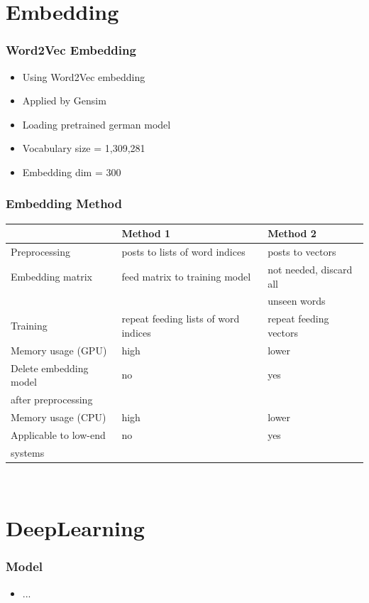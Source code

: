 \documentclass[compress,aspectratio=169]{beamer} %
\begin{document}
\section{Embedding}

\begin{frame}[fragile]
	\frametitle{Word2Vec Embedding}
	\begin{itemize}
		\item Using Word2Vec embedding~\cite{word2vec}
		\item Applied by Gensim~\cite{gensim}
		\item Loading pretrained german model~\cite{depset.ai}
		\item Vocabulary size = 1,309,281
		\item Embedding dim = 300
	\end{itemize}
\end{frame}

\begin{frame}[fragile]
	\frametitle{Embedding Method}
	\centering\small
	\begin{tabular}{l l l}
		& Method 1 & Method 2 \\
		\hline
		Preprocessing & posts to lists of word indices & posts to vectors \\
		\hline
		Embedding matrix & feed matrix to training model & not needed, discard all \\
		& & unseen words \\
		\hline
		Training & repeat feeding lists of word indices & repeat feeding vectors \\
		\hline
		Memory usage (GPU) & high & lower \\
		\hline
		Delete embedding model & no & yes \\
		after preprocessing \\
		\hline
		Memory usage (CPU) & high & lower \\
		\hline
		Applicable to low-end & no & yes \\
		systems \\
	\end{tabular}\\
\end{frame}


\section{DeepLearning}

\begin{frame}[fragile]
	\frametitle{Model}
	\begin{itemize}
		\item ...
	\end{itemize}
\end{frame}
\end{document}
